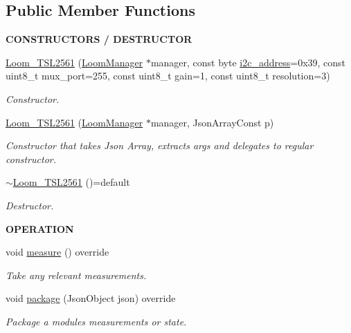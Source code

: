 \subsection*{Public Member Functions}
\begin{Indent}{\bf C\+O\+N\+S\+T\+R\+U\+C\+T\+O\+RS / D\+E\+S\+T\+R\+U\+C\+T\+OR}\par
\begin{DoxyCompactItemize}
\item 
\hyperlink{class_loom___t_s_l2561_abdf8c2e4f396cf2fe4321ba502894668}{Loom\+\_\+\+T\+S\+L2561} (\hyperlink{class_loom_manager}{Loom\+Manager} $\ast$manager, const byte \hyperlink{class_loom_i2_c_sensor_a6ff389c1f015152a9ebfccb037d3d90e}{i2c\+\_\+address}=0x39, const uint8\+\_\+t mux\+\_\+port=255, const uint8\+\_\+t gain=1, const uint8\+\_\+t resolution=3)
\begin{DoxyCompactList}\small\item\em Constructor. \end{DoxyCompactList}\item 
\hyperlink{class_loom___t_s_l2561_a0fa664716211b0aff59ef2fc6088f913}{Loom\+\_\+\+T\+S\+L2561} (\hyperlink{class_loom_manager}{Loom\+Manager} $\ast$manager, Json\+Array\+Const p)
\begin{DoxyCompactList}\small\item\em Constructor that takes Json Array, extracts args and delegates to regular constructor. \end{DoxyCompactList}\item 
\hyperlink{class_loom___t_s_l2561_a65751b9859bbbb47730815c7cd99ee41}{$\sim$\+Loom\+\_\+\+T\+S\+L2561} ()=default
\begin{DoxyCompactList}\small\item\em Destructor. \end{DoxyCompactList}\end{DoxyCompactItemize}
\end{Indent}
\begin{Indent}{\bf O\+P\+E\+R\+A\+T\+I\+ON}\par
\begin{DoxyCompactItemize}
\item 
void \hyperlink{class_loom___t_s_l2561_acbb1c6a57fdf6ef1137f6871f9241d83}{measure} () override
\begin{DoxyCompactList}\small\item\em Take any relevant measurements. \end{DoxyCompactList}\item 
void \hyperlink{class_loom___t_s_l2561_a1efaaba6462bd3c2658d169cfc5132b7}{package} (Json\+Object json) override
\begin{DoxyCompactList}\small\item\em Package a modules measurements or state. \end{DoxyCompactList}\end{DoxyCompactItemize}
\end{Indent}
